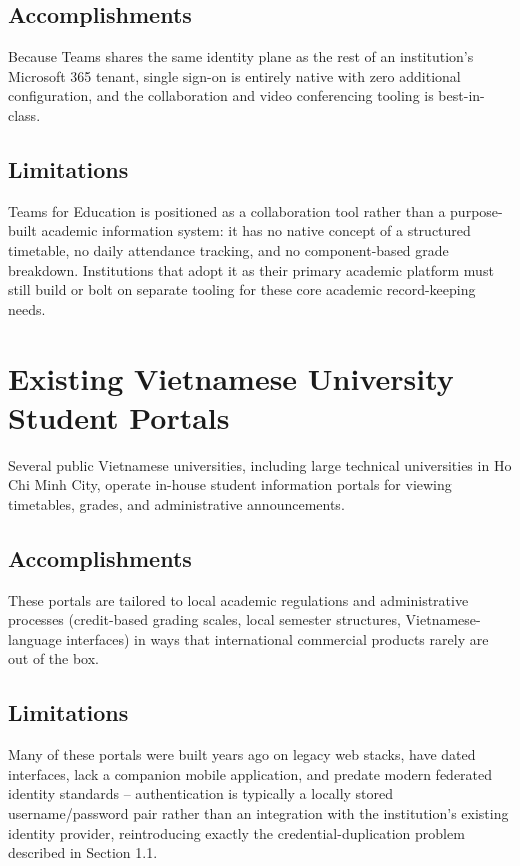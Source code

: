\documentclass[12pt,a4paper]{report}
\begin{document}
\subsection{Accomplishments}

Because Teams shares the same identity plane as the rest of an
institution's Microsoft 365 tenant, single sign-on is entirely native
with zero additional configuration, and the collaboration and video
conferencing tooling is best-in-class.

\subsection{Limitations}

Teams for Education is positioned as a collaboration tool rather than a
purpose-built academic information system: it has no native concept of
a structured timetable, no daily attendance tracking, and no
component-based grade breakdown. Institutions that adopt it as their
primary academic platform must still build or bolt on separate tooling
for these core academic record-keeping needs.

\section{Existing Vietnamese University Student Portals}

Several public Vietnamese universities, including large technical
universities in Ho Chi Minh City, operate in-house student information
portals for viewing timetables, grades, and administrative
announcements.

\subsection{Accomplishments}

These portals are tailored to local academic regulations and
administrative processes (credit-based grading scales, local
semester structures, Vietnamese-language interfaces) in ways that
international commercial products rarely are out of the box.

\subsection{Limitations}

Many of these portals were built years ago on legacy web stacks, have
dated interfaces, lack a companion mobile application, and predate
modern federated identity standards -- authentication is typically a
locally stored username/password pair rather than an integration with
the institution's existing identity provider, reintroducing exactly the
credential-duplication problem described in Section 1.1.
\end{document}
